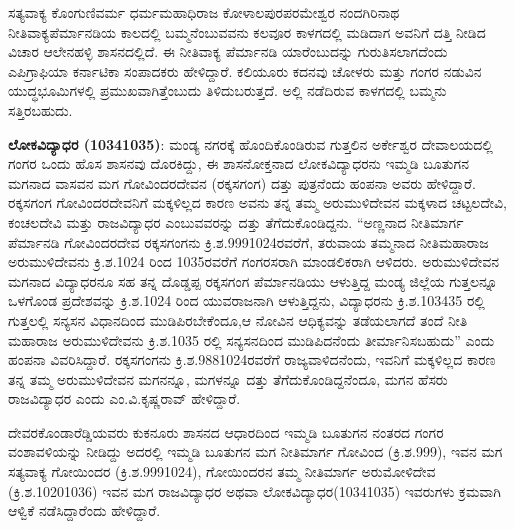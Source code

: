 ಸತ್ಯವಾಕ್ಯ ಕೊಂಗುಣಿವರ್ಮ ಧರ್ಮಮಹಾಧಿರಾಜ ಕೋಳಾಲಪುರಪರಮೇಶ್ವರ ನಂದಗಿರಿನಾಥ ನೀತಿವಾಕ್ಯ\break ಪೆರ್ಮಾನಡಿಯ ಕಾಲದಲ್ಲಿ ಬಮ್ಮನೆಂಬುವವನು ಕಲವೂರ ಕಾಳಗದಲ್ಲಿ ಮಡಿದಾಗ ಅವನಿಗೆ ದತ್ತಿ ನೀಡಿದ ವಿಚಾರ ಆಲೇನಹಳ್ಳಿ ಶಾಸನದಲ್ಲಿದೆ. ಈ ನೀತಿವಾಕ್ಯ ಪೆರ್ಮಾನಡಿ ಯಾರೆಂಬುದನ್ನು ಗುರುತಿಸಲಾಗದೆಂದು ಎಪಿಗ್ರಾಫಿಯಾ ಕರ್ನಾಟಿಕಾ ಸಂಪಾದಕರು ಹೇಳಿದ್ದಾರೆ. ಕಲಿಯೂರು ಕದನವು ಚೋಳರು ಮತ್ತು ಗಂಗರ ನಡುವಿನ ಯುದ್ಧಭೂಮಿಗಳಲ್ಲಿ ಪ್ರಮುಖವಾಗಿ\-ತ್ತೆಂಬುದು ತಿಳಿದುಬರುತ್ತದೆ. ಅಲ್ಲಿ ನಡೆದಿರುವ ಕಾಳಗದಲ್ಲಿ ಬಮ್ಮನು ಸತ್ತಿರಬಹುದು.

\newpage

\textbf{ಲೋಕವಿದ್ಯಾಧರ (1034\general{\enginline{-}}1035)}: ಮಂಡ್ಯ ನಗರಕ್ಕೆ ಹೊಂದಿಕೊಂಡಿರುವ ಗುತ್ತಲಿನ ಅರ್ಕೇಶ್ವರ ದೇವಾಲಯದಲ್ಲಿ ಗಂಗರ ಒಂದು ಹೊಸ ಶಾಸನವು ದೊರಕಿದ್ದು, ಈ ಶಾಸನೋಕ್ತನಾದ ಲೋಕವಿದ್ಯಾಧರನು ಇಮ್ಮಡಿ ಬೂತುಗನ ಮಗನಾದ ವಾಸವನ ಮಗ ಗೋವಿಂದರದೇವನ (ರಕ್ಕಸಗಂಗ) ದತ್ತು ಪುತ್ರನೆಂದು ಹಂಪನಾ ಅವರು ಹೇಳಿದ್ದಾರೆ. ರಕ್ಕಸಗಂಗ ಗೋವಿಂದರದೇವನಿಗೆ ಮಕ್ಕಳಿಲ್ಲದ ಕಾರಣ ಅವನು ತನ್ನ ತಮ್ಮ ಅರುಮುಳಿದೇವನ ಮಕ್ಕಳಾದ ಚಟ್ಟಲದೇವಿ, ಕಂಚಲದೇವಿ ಮತ್ತು ರಾಜವಿದ್ಯಾಧರ ಎಂಬುವವರನ್ನು ದತ್ತು ತೆಗೆದುಕೊಂಡಿದ್ದನು. “ಅಣ್ಣನಾದ ನೀತಿಮಾರ್ಗ ಪೆರ್ಮಾನಡಿ ಗೋವಿಂದರದೇವ ರಕ್ಕಸಗಂಗನು ಕ್ರಿ.ಶ.999\enginline{-}1024ರವರೆಗೆ, ತರುವಾಯ ತಮ್ಮನಾದ ನೀತಿಮಹಾರಾಜ ಅರುಮುಳಿದೇವನು ಕ್ರಿ.ಶ.1024 ರಿಂದ 1035ರವರೆಗೆ ಗಂಗರಸರಾಗಿ ಮಾಂಡಲಿಕರಾಗಿ ಆಳಿದರು. ಅರುಮುಳಿದೇವನ ಮಗನಾದ ವಿದ್ಯಾಧರನೂ ಸಹ ತನ್ನ ದೊಡ್ಡಪ್ಪ ರಕ್ಕಸಗಂಗ ಪೆರ್ಮಾನಡಿಯು ಆಳುತ್ತಿದ್ದ ಮಂಡ್ಯ ಜಿಲ್ಲೆಯ ಗುತ್ತಲನ್ನೂ ಒಳಗೊಂಡ ಪ್ರದೇಶವನ್ನು ಕ್ರಿ.ಶ.1024 ರಿಂದ ಯುವರಾಜನಾಗಿ ಆಳುತ್ತಿದ್ದನು, ವಿದ್ಯಾಧರನು ಕ್ರಿ.ಶ.1034\enginline{-}35 ರಲ್ಲಿ ಗುತ್ತಲಲ್ಲಿ ಸನ್ಯಸನ ವಿಧಾನದಿಂದ ಮುಡಿಪಿರಬೇಕೆಂದೂ,ಆ ನೋವಿನ ಆಧಿಕ್ಯವನ್ನು ತಡೆಯಲಾಗದೆ ತಂದೆ ನೀತಿ ಮಹಾರಾಜ ಅರುಮುಳಿದೇವನು ಕ್ರಿ.ಶ.1035 ರಲ್ಲಿ ಸನ್ಯಸನದಿಂದ ಮುಡಿಪಿದನೆಂದು ತೀರ್ಮಾನಿಸಬಹುದು” ಎಂದು ಹಂಪನಾ ವಿವರಿಸಿದ್ದಾರೆ. ರಕ್ಕಸಗಂಗನು ಕ್ರಿ.ಶ.988\enginline{-}1024ರವರೆಗೆ ರಾಜ್ಯವಾಳಿದನೆಂದು, ಇವನಿಗೆ ಮಕ್ಕಳಿಲ್ಲದ ಕಾರಣ ತನ್ನ ತಮ್ಮ ಅರುಮುಳಿದೇವನ ಮಗನನ್ನೂ, ಮಗಳನ್ನೂ ದತ್ತು ತೆಗೆದುಕೊಂಡಿದ್ದನೆಂದೂ, ಮಗನ ಹೆಸರು ರಾಜವಿದ್ಯಾಧರ ಎಂದು ಎಂ.ವಿ.ಕೃಷ್ಣರಾವ್​ ಹೇಳಿದ್ದಾರೆ.

ದೇವರಕೊಂಡಾರೆಡ್ಡಿಯವರು ಕುಕನೂರು ಶಾಸನದ ಆಧಾರದಿಂದ ಇಮ್ಮಡಿ ಬೂತುಗನ ನಂತರದ ಗಂಗರ ವಂಶಾವಳಿ\-ಯನ್ನು ನೀಡಿದ್ದು ಅದರಲ್ಲಿ ಇಮ್ಮಡಿ ಬೂತುಗನ ಮಗ ನೀತಿಮಾರ್ಗ ಗೋವಿಂದ (ಕ್ರಿ.ಶ.999), ಇವನ ಮಗ ಸತ್ಯವಾಕ್ಯ ಗೋಯಿಂದರ (ಕ್ರಿ.ಶ.999\enginline{-}1024), ಗೋಯಿಂದರನ ತಮ್ಮ ನೀತಿಮಾರ್ಗ ಅರುಮೋಳಿದೇವ (ಕ್ರಿ.ಶ.1020\enginline{-}1036) ಇವನ ಮಗ ರಾಜವಿದ್ಯಾಧರ ಅಥವಾ ಲೋಕವಿದ್ಯಾಧರ(1034\enginline{-}1035) ಇವರುಗಳು ಕ್ರಮವಾಗಿ ಆಳ್ವಿಕೆ ನಡೆಸಿದ್ದಾರೆಂದು ಹೇಳಿದ್ದಾರೆ.


